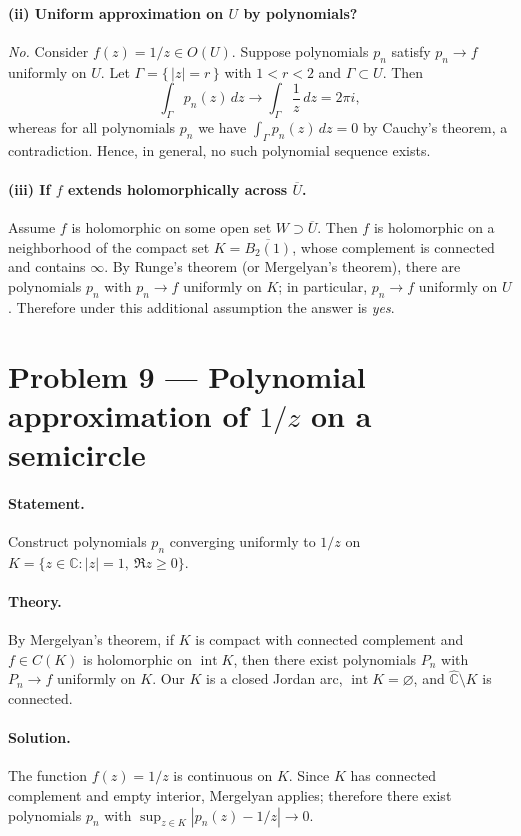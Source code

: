 \documentclass[12pt,a4paper]{article}
\theoremstyle{plain}
\theoremstyle{definition}
\theoremstyle{remark}
\theoremstyle{remark}
\begin{document}
\paragraph{(ii) Uniform approximation on $U$ by polynomials?}
\emph{No.} Consider $f(z)=1/z\in O(U)$. Suppose polynomials $p_n$ satisfy $p_n\to f$
uniformly on $U$. Let $\Gamma=\{\,|z|=r\,\}$ with $1<r<2$ and $\Gamma\subset U$.
Then
\[
\int_\Gamma p_n(z)\,dz \longrightarrow \int_\Gamma \frac{1}{z}\,dz = 2\pi i,
\]
whereas for all polynomials $p_n$ we have $\int_\Gamma p_n(z)\,dz=0$ by Cauchy’s theorem,
a contradiction. Hence, in general, no such polynomial sequence exists.

\paragraph{(iii) If $f$ extends holomorphically across $\overline U$.}
Assume $f$ is holomorphic on some open set $W\supset \overline U$.
Then $f$ is holomorphic on a neighborhood of the compact set $K=\overline{B_2(1)}$,
whose complement is connected and contains $\infty$.
By Runge’s theorem (or Mergelyan’s theorem),
there are polynomials $p_n$ with $p_n\to f$ uniformly on $K$; in particular,
$p_n\to f$ uniformly on $U$.
Therefore under this additional assumption the answer is \emph{yes}.
	
\section*{Problem 9 — Polynomial approximation of $1/z$ on a semicircle}

\paragraph{Statement.}
Construct polynomials $p_n$ converging uniformly to $1/z$ on
$K=\{z\in\mathbb C: |z|=1,\ \Re z\ge 0\}$.

\paragraph{Theory.}
By Mergelyan’s theorem, if $K$ is compact with connected complement and
$f\in C(K)$ is holomorphic on $\operatorname{int}K$, then there exist polynomials
$P_n$ with $P_n\to f$ uniformly on $K$.
Our $K$ is a closed Jordan arc, $\operatorname{int}K=\varnothing$, and
$\widehat{\mathbb C}\setminus K$ is connected.

\paragraph{Solution.}
The function $f(z)=1/z$ is continuous on $K$. Since $K$ has connected complement and
empty interior, Mergelyan applies; therefore there exist polynomials $p_n$ with
$\sup_{z\in K}|p_n(z)-1/z|\to0$.
\end{document}
